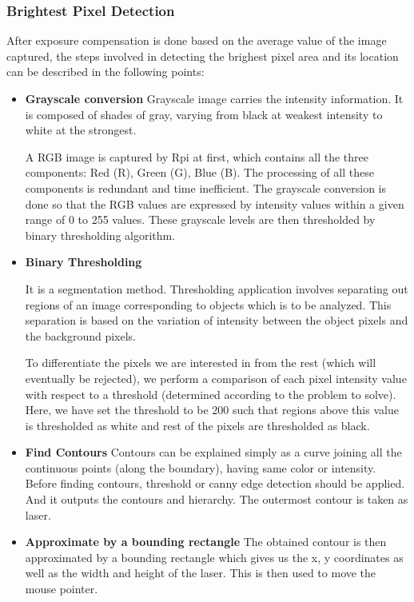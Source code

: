 \documentclass[12pt, a4paper]{article}
\begin{document}
\subsubsection{Brightest Pixel Detection}
After exposure compensation is done based on the average value of the image captured, the steps involved in detecting the brighest pixel area and its location can be described in the following points:
\begin{itemize}
\item {\textbf{Grayscale conversion}}
Grayscale image carries the intensity information. It is composed of shades of gray, varying from black at weakest intensity to white at the strongest. 

A RGB image is captured by Rpi at first, which contains all the three components: Red (R), Green (G), Blue (B). The processing of all these components is redundant and time inefficient. The grayscale conversion is done so that the RGB values are expressed by intensity values within a given range of 0 to 255 values. These grayscale levels are then thresholded by binary thresholding algorithm. 

\item {\textbf{Binary Thresholding}}

It is a segmentation method. Thresholding application involves separating out regions of an image corresponding to objects which is to be analyzed. This separation is based on the variation of intensity between the object pixels and the background pixels.

To differentiate the pixels we are interested in from the rest (which will eventually be rejected), we perform a comparison of each pixel intensity value with respect to a threshold (determined according to the problem to solve). Here, we have set the threshold to be 200 such that regions above this value is thresholded as white and rest of the pixels are thresholded as black.


\item {\textbf{Find Contours}}
Contours can be explained simply as a curve joining all the continuous points (along the boundary), having same color or intensity. Before finding contours, threshold or canny edge detection should be applied. And it outputs the contours and hierarchy.
The outermost contour is taken as laser.

\item{\textbf{Approximate by a bounding rectangle}}
The obtained contour is then approximated by a bounding rectangle which gives us the x, y coordinates as well as the width and height of the laser. This is then used to move the mouse pointer. 

\end{itemize}
		
\end{document}
